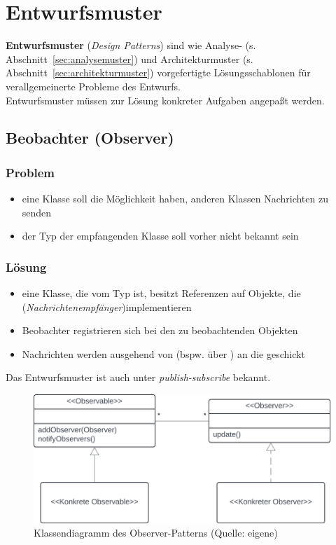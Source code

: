 \section{Entwurfsmuster}

\textbf{Entwurfsmuster} (\textit{Design Patterns}) sind wie Analyse- (s. Abschnitt~\ref{sec:analysemuster}) und Architekturmuster (s. Abschnitt~\ref{sec:architekturmuster}) vorgefertigte Lösungsschablonen für verallgemeinerte Probleme des Entwurfs.\\

\noindent
Entwurfsmuster müssen zur Lösung konkreter Aufgaben angepaßt werden.

\subsection{Beobachter (Observer)}

\subsubsection*{Problem}
\begin{itemize}
    \item eine Klasse soll die Möglichkeit haben, anderen Klassen Nachrichten zu senden
    \item der Typ der empfangenden Klasse soll vorher nicht bekannt sein
\end{itemize}

\subsubsection*{Lösung}
\begin{itemize}
    \item eine Klasse, die vom Typ  ist, besitzt Referenzen auf Objekte, die  (\textit{Nachrichtenempfänger})implementieren
    \item Beobachter registrieren sich bei den zu beobachtenden Objekten
    \item Nachrichten werden ausgehend von  (bspw. über ) an die  geschickt
\end{itemize}

Das Entwurfsmuster ist auch unter \textit{publish-subscribe} bekannt.


\begin{figure}
    \centering
    \includegraphics[scale=0.4]{part two/Objektorientierter Entwurf/img/observer}
    \caption{Klassendiagramm des Observer-Patterns (Quelle: eigene)}
    \label{fig:observer}
\end{figure}

